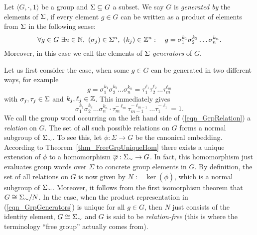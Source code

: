 
\begin{definition}
Let $\langle G, \cdot, 1 \rangle$ be a group and $\Sigma \subseteq G$ a subset. We say $G$ is \emph{generated by} the elements of $\Sigma$, if every element $g \in G$ can be written as a product of elements from $\Sigma$ in the following sense:
\begin{equation}
\label{eqn_GrpGenerators}
\forall g \in G\ \exists n \in \mathbb{N},\ (\sigma_j) \in \Sigma^n,\ (k_j) \in \mathbb{Z}^n:\quad 
g = \sigma_1^{k_1} \sigma_2^{k_2} \dots \sigma_n^{k_n}.
\end{equation}
Moreover, in this case we call the elements of $\Sigma$ \emph{generators} of $G$. 
\end{definition}

Let us first consider the case, when some $g \in G$ can be generated in two  different ways, for example
\begin{equation*}
g = \sigma_1^{k_1} \sigma_2^{k_2} \dots \sigma_n^{k_n} 
  = \tau_1^{\ell_1} \tau_2^{\ell_2} \dots \tau_m^{\ell_m}
\end{equation*}
with $\sigma_j, \tau_j \in \Sigma$ and $k_j, \ell_j \in \mathbb{Z}$. This immediately gives
\begin{equation}
\label{eqn_GrpRelation}
\sigma_1^{k_1} \sigma_2^{k_e} \dots \sigma_n^{k_n} \cdot
\tau_m^{-\ell_m} \tau_{m-1}^{-\ell_{m-1}} \dots \tau_1^{-\ell_1} = 1.
\end{equation}
We call the group word occurring on the left hand side of (\ref{eqn_GrpRelation}) a \emph{relation} on $G$. The set of all such possible relations on $G$ forms a normal subgroup of ${\Sigma}_{\sim}$. To see this, let $\phi : \Sigma \to G$ be the canonical embedding. According to Theorem~\ref{thm_FreeGrpUniqueHom} there exists a unique extension of $\phi$ to a homomorphism $\overline{\varphi}: {\Sigma}_{\sim} \to G$. In fact, this homomorphism just evaluates group words over $\Sigma$ to concrete group elements in $G$. By definition, the set of all relations on $G$ is now given by $N := \ker(\overline{\phi})$, which is a normal subgroup of ${\Sigma}_{\sim}$. Moreover, it follows from the first isomorphism theorem that $G \cong {\Sigma}_{\sim} / N$. In the case, when the product representation in (\ref{eqn_GrpGenerators}) is unique for all $g \in G$, then $N$ just consists of the identity element, $G \cong {\Sigma}_{\sim}$ and $G$ is said to be \emph{relation-free} (this is where the terminology ``free group'' actually comes from). 

